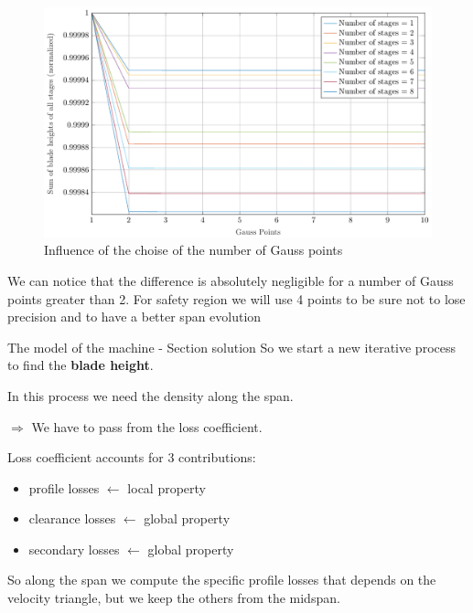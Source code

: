 \documentclass{beamer}
\newcommand{\myspace}[0]{\vspace{0.3cm}}
\newcommand{\myspaceneg}[0]{\vspace{-0.15cm}}
\newcommand{\highlightgreenC}[1]{\textcolor{chameleongreen3}{#1}}%
\newcommand{\highlightgreenD}[1]{\textcolor{chameleongreen4}{#1}}
\begin{document}
\begin{frame}[t]%
\myspaceneg
\myspaceneg
\myspaceneg
\myspaceneg
\begin{figure}[hbtp]
\caption{Influence of the choise of the number of Gauss points}
\centering
\includegraphics[scale=0.55]{fig/ngauss_example.pdf}
\end{figure}
	
\myspaceneg
\myspaceneg
\myspaceneg
We can notice that the difference is absolutely negligible for a number of Gauss points greater than 2.
For safety region we will use 4 points to be sure not to lose precision and to have a better span evolution
	
\end{frame}


\begin{frame}[t]{The model of the machine - Section solution}
So we start a new iterative process to find the \highlightgreenC{\textbf{blade height}}.

In this process we need the density along the span. 

\begin{center}
$\Rightarrow$ We have to pass from the loss coefficient.
\end{center}

Loss coefficient accounts for 3 contributions:
\begin{itemize}
	\item profile losses $\leftarrow$ local property 
	\item clearance losses  $\leftarrow$ global property 
	\item secondary losses  $\leftarrow$ global property 
\end{itemize} 

\myspace
So along the span we compute the specific \highlightgreenC{profile losses} that depends on the velocity triangle, but we keep the others from the midspan.

\end{frame}
\end{document}
